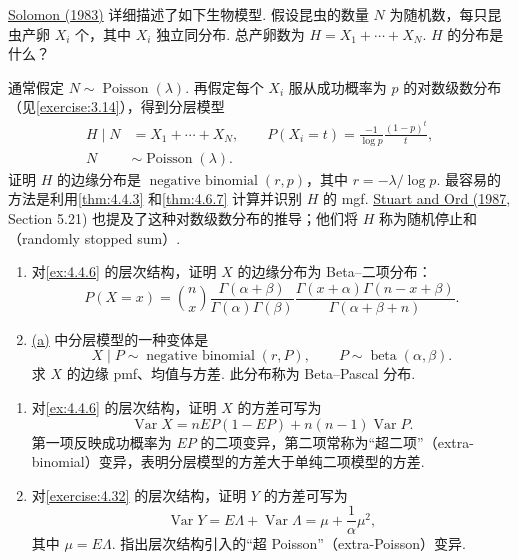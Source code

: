 \begin{exercise}[负二项分布的另一种推导]\label{exercise:4.33}
\hyperref[bib:source297]{Solomon (1983)} 详细描述了如下生物模型. 假设昆虫的数量 $N$ 为随机数，每只昆虫产卵 $X_i$ 个，其中 $X_i$ 独立同分布. 总产卵数为 $H=X_1+\cdots+X_N$. $H$ 的分布是什么？

通常假定 $N\sim\operatorname{Poisson}(\lambda)$. 再假定每个 $X_i$ 服从成功概率为 $p$ 的对数级数分布（见\autoref{exercise:3.14}），得到分层模型
$$\begin{aligned}
H\mid N&=X_1+\cdots+X_N,\qquad P(X_i=t)=\frac{-1}{\log p}\frac{(1-p)^t}t,\\
N&\sim\operatorname{Poisson}(\lambda).
\end{aligned}$$
证明 $H$ 的边缘分布是 $\operatorname{negative\ binomial}(r,p)$，其中 $r=-\lambda/\log p$. 最容易的方法是利用\autoref{thm:4.4.3} 和\autoref{thm:4.6.7} 计算并识别 $H$ 的 mgf. \hyperref[bib:source309]{Stuart and Ord (1987}, Section 5.21) 也提及了这种对数级数分布的推导；他们将 $H$ 称为随机停止和（randomly stopped sum\mbox{）.}
\end{exercise}
\begin{exercise}\label{exercise:4.34}\leavevmode
\begin{enumerate}
\item[(a)]\label{itm:exercise:4.34:a} 对\autoref{ex:4.4.6} 的层次结构，证明 $X$ 的边缘分布为 Beta--二项分布：
$$P(X=x)=\binom nx\frac{\Gamma(\alpha+\beta)}{\Gamma(\alpha)\Gamma(\beta)}\frac{\Gamma(x+\alpha)\Gamma(n-x+\beta)}{\Gamma(\alpha+\beta+n)}.$$
\item[(b)] \hyperref[itm:exercise:4.34:a]{(a)} 中分层模型的一种变体是
$$X\mid P\sim\operatorname{negative\ binomial}(r,P),\qquad P\sim\operatorname{beta}(\alpha,\beta).$$
求 $X$ 的边缘 pmf、均值与方差. 此分布称为 Beta--Pascal 分布.
\end{enumerate}
\end{exercise}
\begin{exercise}\label{exercise:4.35}\leavevmode
\begin{enumerate}
\item[(a)] 对\autoref{ex:4.4.6} 的层次结构，证明 $X$ 的方差可写为
$$\operatorname{Var}X=nEP(1-EP)+n(n-1)\operatorname{Var}P.$$
第一项反映成功概率为 $EP$ 的二项变异，第二项常称为“超二项”（extra-binomial）变异，表明分层模型的方差大于单纯二项模型的方差.
\item[(b)] 对\autoref{exercise:4.32} 的层次结构，证明 $Y$ 的方差可写为
$$\operatorname{Var}Y=E\Lambda+\operatorname{Var}\Lambda=\mu+\frac1\alpha\mu^2,$$
其中 $\mu=E\Lambda$. 指出层次结构引入的“超 Poisson”（extra-Poisson）变异.
\end{enumerate}
\end{exercise}
